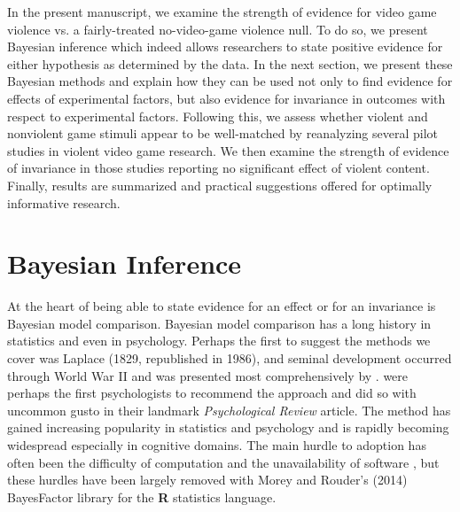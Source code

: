 \documentclass[fignum,nobf,man]{apa}
\begin{document}
In the present manuscript, we examine the strength of evidence for video game violence vs. a fairly-treated no-video-game violence null.  To do so, we present Bayesian inference which indeed allows researchers to state positive evidence for either hypothesis as determined by the data.  In the next section, we present these Bayesian methods and explain how they can be used not only to find evidence for effects of experimental factors, but also evidence for invariance in outcomes with respect to experimental factors.  %
Following this, we assess whether violent and nonviolent game stimuli appear to be well-matched by reanalyzing several pilot studies in violent video game research.  We then examine the strength of evidence of invariance in those studies reporting no significant effect of violent content.  Finally, results are summarized and practical suggestions offered for optimally informative research. %

\section{Bayesian Inference}
At the heart of being able to state evidence for an effect or for an invariance is Bayesian model comparison.  Bayesian model comparison has a long history in statistics and even in psychology.  Perhaps the first to suggest the methods we cover was Laplace (1829, republished in 1986), and seminal development occurred through World War II and was presented most comprehensively by \citet{Jeffreys:1961}.  \citet{Edwards:etal:1963} were perhaps the first psychologists to recommend the approach and did so with uncommon gusto in their landmark {\em Psychological Review} article.  The method has gained increasing popularity in statistics and psychology \citep{Berger:1996,Gallistel:2009,Raftery:1995,Rouder:etal:2009a,Wagenmakers:2007} and is rapidly becoming widespread especially in cognitive domains.  
The main hurdle to adoption has often been the difficulty of computation and the unavailability of software \citep{Gallistel:2009}, but these hurdles have been largely removed with Morey and Rouder's (2014) BayesFactor library for the {\bf R} statistics language.
\end{document}
